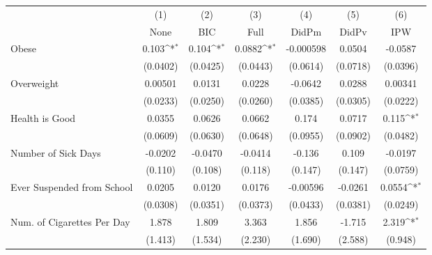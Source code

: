 {
\def\sym#1{\ifmmode^{#1}\else\(^{#1}\)\fi}
\begin{tabular}{l*{6}{c}}
\toprule
            &\multicolumn{1}{c}{(1)}&\multicolumn{1}{c}{(2)}&\multicolumn{1}{c}{(3)}&\multicolumn{1}{c}{(4)}&\multicolumn{1}{c}{(5)}&\multicolumn{1}{c}{(6)}\\
            &\multicolumn{1}{c}{None}&\multicolumn{1}{c}{BIC}&\multicolumn{1}{c}{Full}&\multicolumn{1}{c}{DidPm}&\multicolumn{1}{c}{DidPv}&\multicolumn{1}{c}{IPW}\\
\midrule
Obese       &       0.103\sym{*}  &       0.104\sym{*}  &      0.0882\sym{*}  &   -0.000598         &      0.0504         &     -0.0587         \\
            &    (0.0402)         &    (0.0425)         &    (0.0443)         &    (0.0614)         &    (0.0718)         &    (0.0396)         \\
\addlinespace
Overweight  &     0.00501         &      0.0131         &      0.0228         &     -0.0642         &      0.0288         &     0.00341         \\
            &    (0.0233)         &    (0.0250)         &    (0.0260)         &    (0.0385)         &    (0.0305)         &    (0.0222)         \\
\addlinespace
Health is Good&      0.0355         &      0.0626         &      0.0662         &       0.174         &      0.0717         &       0.115\sym{*}  \\
            &    (0.0609)         &    (0.0630)         &    (0.0648)         &    (0.0955)         &    (0.0902)         &    (0.0482)         \\
\addlinespace
Number of Sick Days&     -0.0202         &     -0.0470         &     -0.0414         &      -0.136         &       0.109         &     -0.0197         \\
            &     (0.110)         &     (0.108)         &     (0.118)         &     (0.147)         &     (0.147)         &    (0.0759)         \\
\addlinespace
Ever Suspended from School&      0.0205         &      0.0120         &      0.0176         &    -0.00596         &     -0.0261         &      0.0554\sym{*}  \\
            &    (0.0308)         &    (0.0351)         &    (0.0373)         &    (0.0433)         &    (0.0381)         &    (0.0249)         \\
\addlinespace
Num. of Cigarettes Per Day&       1.878         &       1.809         &       3.363         &       1.856         &      -1.715         &       2.319\sym{*}  \\
            &     (1.413)         &     (1.534)         &     (2.230)         &     (1.690)         &     (2.588)         &     (0.948)         \\
\bottomrule
\end{tabular}
}
